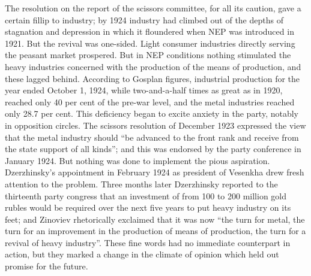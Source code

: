 The resolution on the report of the scissors committee, for all its caution, gave a certain fillip to industry; by 1924 industry had climbed out of the depths of stagnation and depression in which it floundered when NEP was introduced in 1921. But the revival was one-sided. Light consumer industries directly serving the peasant market prospered. But in NEP conditions nothing stimulated the heavy industries concerned with the production of the means of production, and these lagged behind. According to Gosplan figures, industrial production for the year ended October 1, 1924, while two-and-a-half times as great as in 1920, reached only 40 per cent of the pre-war level, and the metal industries reached only 28.7 per cent. This deficiency began to excite anxiety in the party, notably in opposition circles. The scissors resolution of December 1923 expressed the view that the metal industry should ``be advanced to the front rank and receive from the state support of all kinds''; and this was endorsed by the party conference in January 1924. But nothing was done to implement the pious aspiration. Dzerzhinsky's appointment in February 1924 as president of Vesenkha drew fresh attention to the problem. Three months later Dzerzhinsky reported to the thirteenth party congress that an investment of from 100 to 200 million gold rubles would be required over the next five years to put heavy industry on its feet; and Zinoviev rhetorically exclaimed that it was now ``the turn for metal, the turn for an improvement in the production of means of production, the turn for a revival of heavy industry''. These fine words had no immediate counterpart in action, but they marked a change in the climate of opinion which held out promise for the future. 

